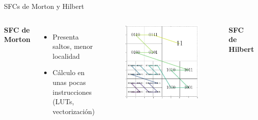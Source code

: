 \documentclass[aspectratio=169]{beamer}
\begin{document}
\begin{frame}{SFCs de Morton y Hilbert}
    \begin{columns}
            \textbf{SFC de Morton} \cite{morton1966computer}
            \begin{itemize}
                \item Presenta saltos, menor localidad
                \item Cálculo en unas pocas instrucciones (LUTs, vectorización)
            \end{itemize}
            \begin{figure}
                \includegraphics[scale=0.27]{img/morton_quadtree.pdf}
            \end{figure}
            \textbf{SFC de Hilbert} \cite{lam1994class,miki2017gothic}


\end{columns}
\end{frame}
\end{document}
